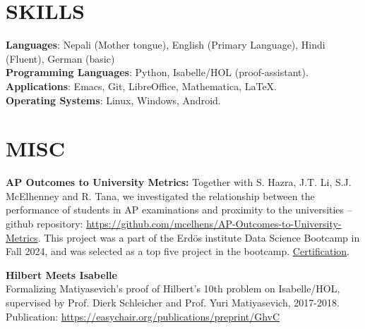 \documentclass[margin]{res}
\begin{document}
\begin{resume}
\section{SKILLS}
\textbf{Languages}: Nepali (Mother tongue), English (Primary Language), Hindi (Fluent), German (basic)\\
\textbf{Programming Languages}: Python, Isabelle/HOL (proof-assistant).
\\
\textbf{Applications}: Emacs, Git, LibreOffice, Mathematica, \LaTeX.
\\
\textbf{Operating Systems}: 
Linux, Windows, Android.

\section{MISC}
\par
\textbf{AP Outcomes to University Metrics:} Together with S. Hazra, J.T. Li, S.J. McElhenney and R. Tana, we investigated the relationship between the performance of students in AP examinations and proximity to the universities -- github repository: \url{https://github.com/mcelhens/AP-Outcomes-to-University-Metrics}. This project was a part of the Erd\"os institute Data Science Bootcamp in Fall 2024, and was selected as a top five project in the bootcamp. \href{https://www.erdosinstitute.org/certificates/fall-2024/data-science-boot-camp/prabhat-devkota/c3a790a9-ebfc-4f88-9f69-a6d03f26921a}{Certification}.
\par
\textbf{Hilbert Meets Isabelle}\\ 
Formalizing Matiyasevich's proof of Hilbert's 10th problem on Isabelle/HOL, supervised by Prof. Dierk Schleicher and Prof. Yuri Matiyasevich, 2017-2018. Publication: \url{https://easychair.org/publications/preprint/GhvC}
\end{resume}
\end{document}
